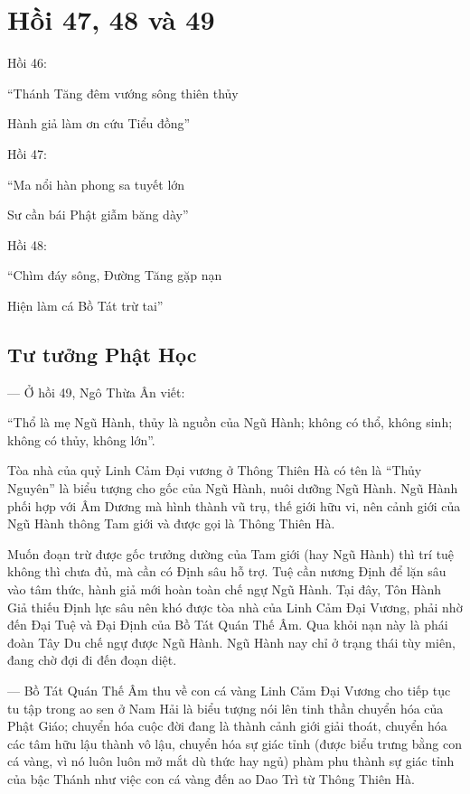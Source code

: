\chapter{Hồi 47, 48 và 49} %
\label{cha:hoi_47_48}

Hồi 46:

\begin{itshape}
``Thánh Tăng đêm vướng sông thiên thủy

Hành giả làm ơn cứu Tiểu đồng''
\end{itshape}

Hồi 47:

\begin{itshape}
``Ma nổi hàn phong sa tuyết lớn

Sư cần bái Phật giẫm băng dày''
\end{itshape}

Hồi 48:

\begin{itshape}
``Chìm đáy sông, Đường Tăng gặp nạn

Hiện làm cá Bồ Tát trừ tai''
\end{itshape}

\section{Tư tưởng Phật Học} %
\label{sec:47_48_phat_hoc}

— Ở hồi 49, Ngô Thừa Ân viết:

``Thổ là mẹ Ngũ Hành, thủy là nguồn của Ngũ Hành; không có thổ, không sinh; không có thủy, không lớn''.

Tòa nhà của quỷ Linh Cảm Đại vương ở Thông Thiên Hà có tên là ``Thủy Nguyên'' là biểu tượng cho gốc của Ngũ Hành, nuôi dưỡng Ngũ Hành. Ngũ Hành phối hợp với Âm Dương mà hình thành vũ trụ, thế giới hữu vi, nên cảnh giới của Ngũ Hành thông Tam giới và được gọi là Thông Thiên Hà.

Muốn đoạn trừ được gốc trưởng dường của Tam giới (hay Ngũ Hành) thì trí tuệ không thì chưa đủ, mà cần có Định sâu hỗ trợ. Tuệ cần nương Định để lặn sâu vào tâm thức, hành giả mới hoàn toàn chế ngự Ngũ Hành. Tại đây, Tôn Hành Giả thiếu Định lực sâu nên khó được tòa nhà của Linh Cảm Đại Vương, phải nhờ đến Đại Tuệ và Đại Định  của Bồ Tát Quán Thế Âm. Qua khỏi nạn này là phái đoàn Tây Du chế ngự được Ngũ Hành. Ngũ Hành nay chỉ ở trạng thái tùy miên, đang chờ đợi đi đến đoạn diệt.

— Bồ Tát Quán Thế Âm thu về con cá vàng Linh Cảm Đại Vương cho tiếp tục tu tập trong ao sen ở Nam Hải là biểu tượng nói lên tinh thần chuyển hóa của Phật Giáo; chuyển hóa cuộc đời đang là thành cảnh giới giải thoát, chuyển hóa các tâm hữu lậu thành vô lậu, chuyển hóa sự giác tỉnh (được biểu trưng bằng con cá vàng, vì nó luôn luôn mở mắt dù thức hay ngủ) phàm phu thành sự giác tỉnh của bậc Thánh như việc con cá vàng đến ao Dao Trì từ Thông Thiên Hà.

